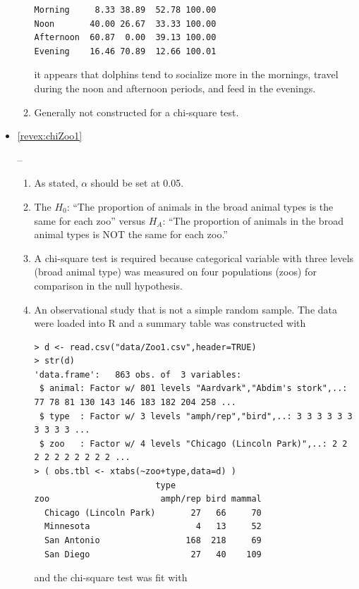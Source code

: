 \documentclass[10pt,openany]{book}\usepackage[]{graphicx}\usepackage[]{color}
\makeatletter
\newenvironment{kframe}{%
 \def\at@end@of@kframe{}%
 \ifinner\ifhmode%
  \def\at@end@of@kframe{\end{minipage}}%
  \begin{minipage}{\columnwidth}%
 \fi\fi%
 \def\FrameCommand##1{\hskip\@totalleftmargin \hskip-\fboxsep
 \colorbox{shadecolor}{##1}\hskip-\fboxsep
     \hskip-\linewidth \hskip-\@totalleftmargin \hskip\columnwidth}%
 \MakeFramed {\advance\hsize-\width
   \@totalleftmargin\z@ \linewidth\hsize
   \@setminipage}}%
 {\par\unskip\endMakeFramed%
 \at@end@of@kframe}
\newenvironment{knitrout}{}{} %
\makeatother
\begin{document}
\begin{itemize}
\begin{enumerate}
\begin{knitrout}
\begin{kframe}
\begin{verbatim}
Morning     8.33 38.89  52.78 100.00
Noon       40.00 26.67  33.33 100.00
Afternoon  60.87  0.00  39.13 100.00
Evening    16.46 70.89  12.66 100.01
\end{verbatim}
\end{kframe}
\end{knitrout}
it appears that dolphins tend to socialize more in the mornings, travel during the noon and afternoon periods, and feed in the evenings.
      \item Generally not constructed for a chi-square test.
    \end{enumerate}
  \item \hypertarget{ans:chiZoo1}{\ref{revex:chiZoo1}} --
    \begin{enumerate}
      \item As stated, $\alpha$ should be set at 0.05.
      \item The $H_{0}$: ``The proportion of animals in the broad animal types is the same for each zoo'' versus $H_{A}$: ``The proportion of animals in the broad animal types is NOT the same for each zoo.''
      \item A chi-square test is required because categorical variable with three levels (broad animal type) was measured on four populations (zoos) for comparison in the null hypothesis.
      \item An observational study that is not a simple random sample.  The data were loaded into R and a summary table was constructed with
\begin{knitrout}
\color{fgcolor}\begin{kframe}
\begin{verbatim}
> d <- read.csv("data/Zoo1.csv",header=TRUE)
> str(d)
'data.frame':	863 obs. of  3 variables:
 $ animal: Factor w/ 801 levels "Aardvark","Abdim's stork",..: 77 78 81 130 143 146 183 182 204 258 ...
 $ type  : Factor w/ 3 levels "amph/rep","bird",..: 3 3 3 3 3 3 3 3 3 3 ...
 $ zoo   : Factor w/ 4 levels "Chicago (Lincoln Park)",..: 2 2 2 2 2 2 2 2 2 2 ...
> ( obs.tbl <- xtabs(~zoo+type,data=d) )
                        type
zoo                      amph/rep bird mammal
  Chicago (Lincoln Park)       27   66     70
  Minnesota                     4   13     52
  San Antonio                 168  218     69
  San Diego                    27   40    109
\end{verbatim}
\end{kframe}
\end{knitrout}
and the chi-square test was fit with

\end{enumerate}
\end{itemize}
\end{document}
